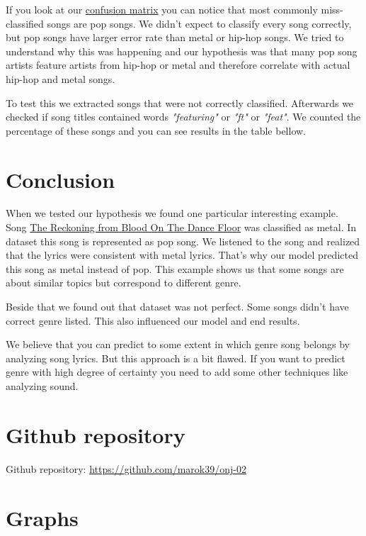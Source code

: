 \documentclass[a4paper,11pt]{article}
\begin{document}
If you look at our \hyperref[label-cf-matrix]{confusion matrix} you can notice that most commonly miss-classified songs are pop songs. We didn't expect to classify every song correctly, but pop songs have larger error rate than metal or hip-hop songs. We tried to understand why this was happening and our hypothesis was that many pop song artists feature artists from hip-hop or metal and therefore correlate with actual hip-hop and metal songs.

To test this we extracted songs that were not correctly classified. Afterwards we checked if song titles contained words \textit{"featuring"} or \textit{"ft"} or \textit{"feat"}. We counted the percentage of these songs and you can see results in the table bellow.


\section{Conclusion}

When we tested our hypothesis we found one particular interesting example. Song \href{https://www.youtube.com/watch?v=iKFYrPH5nRI}{The Reckoning from Blood On The Dance Floor} was classified as metal. In dataset this song is represented as pop song. We listened to the song and realized that the lyrics were consistent with metal lyrics. That's why our model predicted this song as metal instead of pop. This example shows us that some songs are about similar topics but correspond to different genre.

Beside that we found out that dataset was not perfect. Some songs didn't have correct genre listed. This also influenced our model and end results.

We believe that you can predict to some extent in which genre song belongs by analyzing song lyrics. But this approach is a bit flawed. If you want to predict genre with high degree of certainty you need to add some other techniques like analyzing sound.


\section{Github repository}
Github repository: \href{https://github.com/marok39/onj-02}{https://github.com/marok39/onj-02}

\pagebreak
\appendix
\appendixpage
\section{\label{label-graphs} Graphs}
\end{document}
